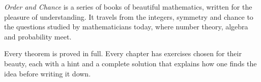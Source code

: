 \emph{Order and Chance} is a series of books of beautiful mathematics, written for the pleasure
of understanding. It travels from the integers, symmetry and chance to the questions studied by
mathematicians today, where number theory, algebra and probability meet.\par\medskip
Every theorem is proved in full. Every chapter has exercises chosen for their beauty, each with
a hint and a complete solution that explains how one finds the idea before writing it down.
